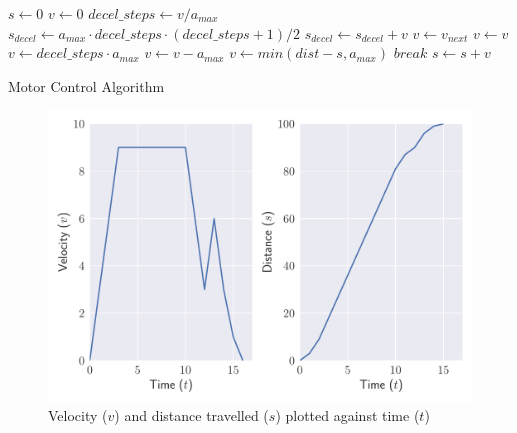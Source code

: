 \begin{algorithm}[h]
  \begin{algorithmic}[1]
\State $s \gets 0$
\State $v \gets 0$
  \State $decel\_steps\gets v / a_{max}$
  \State $s_{decel} \gets a_{max} \cdot decel\_steps \cdot (decel\_steps + 1) / 2$
    \State $s_{decel} \gets s_{decel} + v$
  \EndIf
    \State $v \gets v_{next}$ 
    \State $ v \gets v $     
  \Else
      \State $v \gets decel\_steps \cdot a_{max}$
    \Else
      \State $v \gets v - a_{max}$
      \EndIf
  \EndIf
      
      \State $v \gets min(dist - s, a_{max})$
    \Else
      \State $break$  
      \EndIf
      \EndIf
  \State $s \gets s + v$
\EndWhile
\end{algorithmic}
\caption{Motor Control Algorithm\label{alg-motor}}
\end{algorithm}
\begin{figure}[h]
  \centerline{\includegraphics[scale=0.65]{fig/motor_control_graph.pdf}}
\caption{Velocity ($v$) and distance travelled ($s$) plotted against time ($t$)\label{fig-motor}}
\end{figure}


